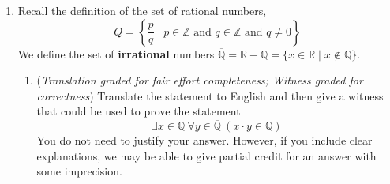 \documentclass[12pt, oneside]{article}
\begin{document}
\begin{enumerate}
\begin{enumerate}
        {\bf Recursive step}: Consider an arbitrary: $l' \in L$, $n \in \mathbb{N}$, and we  assume
        as the {\bf induction hypothesis} that:
        \[
            \underline{\text{BLANK~3}}
        \]
        Our goal is to show that 
        \[
            \forall m \in \mathbb{N} ~(~length(prepend(~(~(n,l')~,m)~)) = length(append(~(~(n,l'),m)~))~)
        \]
        is also true. Let $m$ be an arbitrary natural number. Calculating: 
        \[
            LHS = \underline{\text{BLANK~4}}
        \]
        \[
            RHS = \underline{\text{BLANK~5}}
        \]
        Since $LHS = RHS$, the recursive step is complete.

        \item ({\it Graded for correctness}\footnote{Graded for correctness means your solution will be
        evaluated not only on the correctness of your answers, but on your ability to 
        present your ideas clearly and logically. You should explain how you arrived at your conclusions, using 
        mathematically sound reasoning. Whether you use formal proof techniques or write a more informal argument for why 
        something is true, your answers should always be well-supported. Your goal should be to convince the reader that 
        your results and methods are sound.}) Disprove the statement 
        \[
            \forall l\in L~ \forall m \in \mathbb{N} ~(~prepend(~(l,m)~) = append(~(l,m)~)~)
        \]

        \item ({\it Graded for correctness}) Determine whether the statement
        \[
            \exists l\in L~ \exists m \in \mathbb{N} ~(~prepend(~(l,m)~) = append(~(l,m)~)~)
        \]
        is true or false, and justify your conclusion using valid proof strategies.
    \end{enumerate}

    \item Recall the definition of the set of rational numbers,
    $$Q = \left\{ \frac{p}{q} \mid p \in \mathbb{Z}  \text{ and  } q  \in \mathbb{Z} \text{ and } q \neq  0 \right\}$$
    We define the set of {\bf irrational} numbers $\overline{\mathbb{Q}} = \mathbb{R} - \mathbb{Q}
    = \{ x \in \mathbb{R} \mid x \notin \mathbb{Q} \}$. 

    \begin{enumerate}
        \item ({\it Translation graded for fair effort completeness; Witness graded 
        for correctness}) Translate the statement to English and then give a witness 
        that could be used to prove the statement 
        \[
        \exists x \in \mathbb{Q}~ \forall y \in \overline{\mathbb{Q}} ~(x\cdot y \in \mathbb{Q})
        \]
        You do not need to justify your answer.  However, if you include clear explanations, 
        we may be able to give partial credit for an answer with some imprecision.
   

\end{enumerate}
\end{enumerate}
\end{document}
